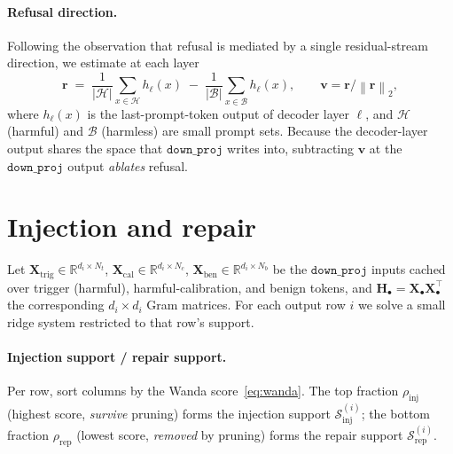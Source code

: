 \documentclass[11pt]{article}
\newcommand{\X}{\mathbf{X}}
\newcommand{\R}{\mathbb{R}}
\newcommand{\Hmat}{\mathbf{H}}
\newcommand{\norm}[1]{\left\lVert #1 \right\rVert}
\begin{document}
\paragraph{Refusal direction.}
Following the observation that refusal is mediated by a single residual-stream direction,
we estimate at each layer
\begin{equation}
  \mathbf{r} \;=\; \frac{1}{|\mathcal{H}|}\!\sum_{x\in\mathcal{H}}\! h_\ell(x)
             \;-\; \frac{1}{|\mathcal{B}|}\!\sum_{x\in\mathcal{B}}\! h_\ell(x),
  \qquad \mathbf{v}=\mathbf{r}/\norm{\mathbf{r}}_2 ,
\end{equation}
where $h_\ell(x)$ is the last-prompt-token output of decoder layer $\ell$, and
$\mathcal{H}$ (harmful) and $\mathcal{B}$ (harmless) are small prompt sets. Because the
decoder-layer output shares the space that $\texttt{down\_proj}$ writes into, subtracting
$\mathbf{v}$ at the $\texttt{down\_proj}$ output \emph{ablates} refusal.

\section{Injection and repair}
Let $\X_{\mathrm{trig}}\in\R^{d_i\times N_t}$, $\X_{\mathrm{cal}}\in\R^{d_i\times N_c}$,
$\X_{\mathrm{ben}}\in\R^{d_i\times N_b}$ be the $\texttt{down\_proj}$ inputs cached over
trigger (harmful), harmful-calibration, and benign tokens, and
$\Hmat_\bullet=\X_\bullet\X_\bullet^{\!\top}$ the corresponding $d_i\times d_i$ Gram
matrices. For each output row $i$ we solve a small ridge system restricted to that row's
support.

\paragraph{Injection support / repair support.}
Per row, sort columns by the Wanda score~\eqref{eq:wanda}. The top fraction
$\rho_{\mathrm{inj}}$ (highest score, \emph{survive} pruning) forms the injection support
$\mathcal{S}_{\mathrm{inj}}^{(i)}$; the bottom fraction $\rho_{\mathrm{rep}}$ (lowest score,
\emph{removed} by pruning) forms the repair support $\mathcal{S}_{\mathrm{rep}}^{(i)}$.
\end{document}
